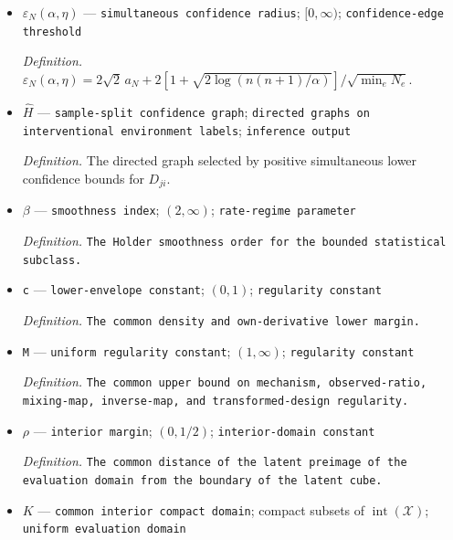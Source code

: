 \documentclass{article}
\begin{document}
\begin{itemize}
  \par\smallskip\noindent\emph{Definition.} The norm of the difference of empirical Gaussian-kernel mean embeddings of \(\widehat R_i(X)\) under evaluation samples from environments \(0\) and \(j\).
  \item \(\varepsilon_N(\alpha,\eta)\) --- \texttt{simultaneous confidence radius}; \([0,\infty)\); \texttt{confidence-\allowbreak{}edge threshold}
  \par\smallskip\noindent\emph{Definition.} \(\varepsilon_N(\alpha,\eta)=2\sqrt 2\,a_N+2[1+\sqrt{2\log(n(n+1)/\alpha)}]/\sqrt{\min_e N_e}\).
  \item \(\widehat H\) --- \texttt{sample-\allowbreak{}split confidence graph}; \texttt{directed graphs on interventional environment labels}; \texttt{inference output}
  \par\smallskip\noindent\emph{Definition.} The directed graph selected by positive simultaneous lower confidence bounds for \(D_{ji}\).
  \item \(\beta\) --- \texttt{smoothness index}; \((2,\infty)\); \texttt{rate-\allowbreak{}regime parameter}
  \par\smallskip\noindent\emph{Definition.} \texttt{The Holder smoothness order for the bounded statistical subclass.}
  \item \texttt{c} --- \texttt{lower-\allowbreak{}envelope constant}; \((0,1)\); \texttt{regularity constant}
  \par\smallskip\noindent\emph{Definition.} \texttt{The common density and own-\allowbreak{}derivative lower margin.}
  \item \texttt{M} --- \texttt{uniform regularity constant}; \((1,\infty)\); \texttt{regularity constant}
  \par\smallskip\noindent\emph{Definition.} \texttt{The common upper bound on mechanism,\allowbreak{} observed-\allowbreak{}ratio,\allowbreak{} mixing-\allowbreak{}map,\allowbreak{} inverse-\allowbreak{}map,\allowbreak{} and transformed-\allowbreak{}design regularity.}
  \item \(\rho\) --- \texttt{interior margin}; \((0,1/2)\); \texttt{interior-\allowbreak{}domain constant}
  \par\smallskip\noindent\emph{Definition.} \texttt{The common distance of the latent preimage of the evaluation domain from the boundary of the latent cube.}
  \item \(K\) --- \texttt{common interior compact domain}; compact subsets of \(\operatorname{int}(\mathcal X)\); \texttt{uniform evaluation domain}

\end{itemize}
\end{document}
